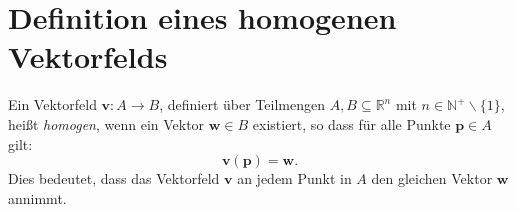 \documentclass[a4paper,12pt]{article}
\begin{document}
\section*{Definition eines homogenen Vektorfelds}
Ein Vektorfeld $\mathbf{v}: A \rightarrow B$, definiert über Teilmengen $A, B \subseteq \mathbb{R}^n$ mit $n \in \mathbb{N}^+ \backslash \{1\}$, heißt \textit{homogen}, wenn ein Vektor $\mathbf{w} \in B$ existiert, so dass für alle Punkte $\mathbf{p} \in A$ gilt:
\[ \mathbf{v}(\mathbf{p}) = \mathbf{w}. \]
Dies bedeutet, dass das Vektorfeld $\mathbf{v}$ an jedem Punkt in $A$ den gleichen Vektor $\mathbf{w}$ annimmt.
\end{document}
